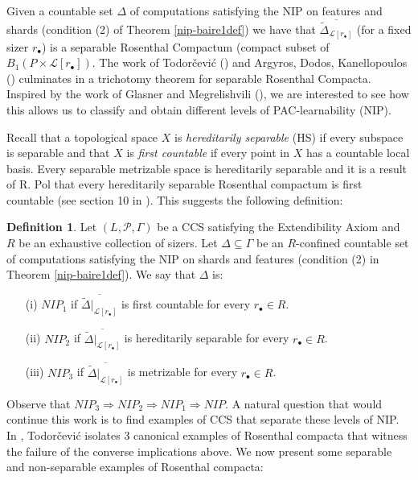 \documentclass[psamsfonts]{amsart}
\theoremstyle{definition}
\newtheorem{defn}[thm]{Definition}
\theoremstyle{remark}
\numberwithin{equation}{section}
\begin{document}
Given a countable set $\Delta$ of computations satisfying the NIP on features and shards (condition (2) of Theorem \ref{nip-baire1def}) we have that $\overline{\tilde\Delta_{\mathcal{L}[r_\bullet]}}$ (for a fixed sizer $r_\bullet$) is a separable Rosenthal Compactum (compact subset of $B_1(P\times\mathcal{L}[r_\bullet])$. The work of Todorčević (\cite{Todorcevic_1999_CompactSubsetsBaire}) and Argyros, Dodos, Kanellopoulos (\cite{argyros2008rosenthal}) culminates in a trichotomy theorem for separable Rosenthal Compacta. Inspired by the work of Glasner and Megrelishvili (\cite{glasner2022tame}), we are interested to see how this allows us to classify and obtain different levels of PAC-learnability (NIP).

Recall that a topological space $X$ is \emph{hereditarily separable} (HS) if every subspace is separable and that $X$ is \emph{first countable} if every point in $X$ has a countable local basis. Every separable metrizable space is hereditarily separable and it is a result of R. Pol that every hereditarily separable Rosenthal compactum is first countable (see section 10 in \cite{debs2013rosenthal}). This suggests the following definition:

\begin{defn}
    Let $(L,\mathcal{P},\Gamma)$ be a CCS satisfying the Extendibility Axiom and $R$ be an exhaustive collection of sizers. Let $\Delta\subseteq\Gamma$ be an $R$-confined countable set of computations satisfying the NIP on shards and features (condition (2) in Theorem \ref{nip-baire1def}). We say that $\Delta$ is:
    \begin{itemize}
        \item [(i)] $NIP_1$ if $\overline{\tilde\Delta|_{\mathcal{L}[r_\bullet]}}$ is first countable for every $r_\bullet\in R$.
        \item [(ii)] $NIP_2$ if $\overline{\tilde\Delta|_{\mathcal{L}[r_\bullet]}}$ is hereditarily separable for every $r_\bullet\in R$.
        \item [(iii)] $NIP_3$ if $\overline{\tilde\Delta|_{\mathcal{L}[r_\bullet]}}$ is metrizable for every $r_\bullet\in R$.
    \end{itemize}
\end{defn}

Observe that $NIP_3 \Rightarrow NIP_2\Rightarrow NIP_1\Rightarrow NIP$. A natural question that would continue this work is to find examples of CCS that separate these levels of NIP. In \cite{Todorcevic_1999_CompactSubsetsBaire}, Todorčević isolates 3 canonical examples of Rosenthal compacta that witness the failure of the converse implications above. We now present some separable and non-separable examples of Rosenthal compacta:
\end{document}
